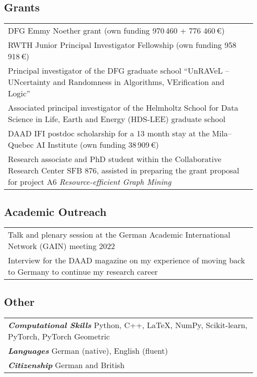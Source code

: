 \documentclass[10pt, a4paper, DIV=14, headings=small]{scrartcl}
\begin{document}
\subsection*{Grants}
\begin{tabular}{p{14.5cm}}
	DFG Emmy Noether grant (own funding 970\,460 + 776 460\,€)                                                 \\[0.5em]

	RWTH Junior Principal Investigator Fellowship (own funding 958\,918\,€)                                    \\[0.5em]
	
	Principal investigator of the DFG graduate school ``UnRAVeL -- UNcertainty and Randomness in Algorithms, VErification and Logic''  \\[1.5em]
	
	Associated principal investigator of the Helmholtz School for Data Science in Life, Earth and Energy (HDS-LEE) graduate school  \\[1.5em]
	 
	DAAD IFI postdoc scholarship for a 13 month stay at the Mila--Quebec AI Institute (own funding 38\,909\,€) \\[1.5em]

	Research associate and PhD student  within the Collaborative Research Center SFB 876, assisted in preparing the  grant proposal for project A6 \emph{Resource-efficient Graph Mining}\\
\end{tabular}

\subsection*{Academic Outreach}
\begin{tabular}{p{14.5cm}}
	Talk and plenary session at the German Academic International Network (GAIN) meeting 2022 \\[0.5em]

	Interview for the DAAD magazine on my experience of moving back to Germany to continue my research career
\end{tabular}

\subsection*{Other}

\begin{tabular}{l}
	\textsf{\textbf{\em Computational Skills}} Python, C\hspace{-1pt}+\hspace{-1pt}+, \LaTeX, NumPy, Scikit-learn, PyTorch, PyTorch Geometric \\[0.2em]
	\textsf{\textbf{\em Languages}} German (native), English (fluent)                                                                         \\[0.2em]
	\textsf{\textbf{\em Citizenship}} German and British\\
\end{tabular}
\end{document}
